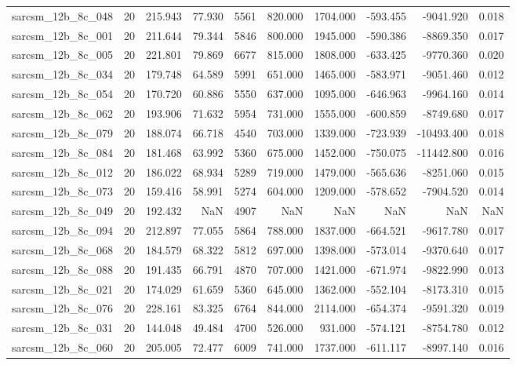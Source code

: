 \begin{tabular}{lrrrrrrrrr}
sarcsm\_12b\_8c\_048 & 20 & 215.943 & 77.930 & 5561 & 820.000 & 1704.000 & -593.455 & -9041.920 & 0.018 \\
sarcsm\_12b\_8c\_001 & 20 & 211.644 & 79.344 & 5846 & 800.000 & 1945.000 & -590.386 & -8869.350 & 0.017 \\
sarcsm\_12b\_8c\_005 & 20 & 221.801 & 79.869 & 6677 & 815.000 & 1808.000 & -633.425 & -9770.360 & 0.020 \\
sarcsm\_12b\_8c\_034 & 20 & 179.748 & 64.589 & 5991 & 651.000 & 1465.000 & -583.971 & -9051.460 & 0.012 \\
sarcsm\_12b\_8c\_054 & 20 & 170.720 & 60.886 & 5550 & 637.000 & 1095.000 & -646.963 & -9964.160 & 0.014 \\
sarcsm\_12b\_8c\_062 & 20 & 193.906 & 71.632 & 5954 & 731.000 & 1555.000 & -600.859 & -8749.680 & 0.017 \\
sarcsm\_12b\_8c\_079 & 20 & 188.074 & 66.718 & 4540 & 703.000 & 1339.000 & -723.939 & -10493.400 & 0.018 \\
sarcsm\_12b\_8c\_084 & 20 & 181.468 & 63.992 & 5360 & 675.000 & 1452.000 & -750.075 & -11442.800 & 0.016 \\
sarcsm\_12b\_8c\_012 & 20 & 186.022 & 68.934 & 5289 & 719.000 & 1479.000 & -565.636 & -8251.060 & 0.015 \\
sarcsm\_12b\_8c\_073 & 20 & 159.416 & 58.991 & 5274 & 604.000 & 1209.000 & -578.652 & -7904.520 & 0.014 \\
sarcsm\_12b\_8c\_049 & 20 & 192.432 & NaN & 4907 & NaN & NaN & NaN & NaN & NaN \\
sarcsm\_12b\_8c\_094 & 20 & 212.897 & 77.055 & 5864 & 788.000 & 1837.000 & -664.521 & -9617.780 & 0.017 \\
sarcsm\_12b\_8c\_068 & 20 & 184.579 & 68.322 & 5812 & 697.000 & 1398.000 & -573.014 & -9370.640 & 0.017 \\
sarcsm\_12b\_8c\_088 & 20 & 191.435 & 66.791 & 4870 & 707.000 & 1421.000 & -671.974 & -9822.990 & 0.013 \\
sarcsm\_12b\_8c\_021 & 20 & 174.029 & 61.659 & 5360 & 645.000 & 1362.000 & -552.104 & -8173.310 & 0.015 \\
sarcsm\_12b\_8c\_076 & 20 & 228.161 & 83.325 & 6764 & 844.000 & 2114.000 & -654.374 & -9591.320 & 0.019 \\
sarcsm\_12b\_8c\_031 & 20 & 144.048 & 49.484 & 4700 & 526.000 & 931.000 & -574.121 & -8754.780 & 0.012 \\
sarcsm\_12b\_8c\_060 & 20 & 205.005 & 72.477 & 6009 & 741.000 & 1737.000 & -611.117 & -8997.140 & 0.016 \\

\end{tabular}
